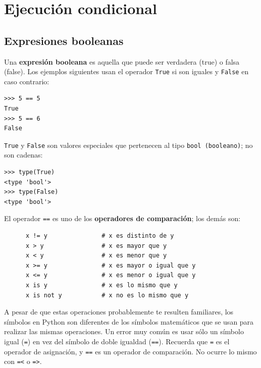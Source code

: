 
\chapter{Ejecución condicional}

\section{Expresiones booleanas}

Una {\bf expresión booleana} es aquella que puede ser verdadera (true)
o falsa (false). Los ejemplos siguientes usan el operador
{\tt True} si son iguales y {\tt False} en caso contrario:

\beforeverb
\begin{verbatim}
>>> 5 == 5
True
>>> 5 == 6
False
\end{verbatim}
\afterverb
%
{\tt True} y {\tt False} son valores especiales
que pertenecen al tipo {\tt bool (booleano)}; no son cadenas:


\beforeverb
\begin{verbatim}
>>> type(True)
<type 'bool'>
>>> type(False)
<type 'bool'>
\end{verbatim}
\afterverb
%
El operador {\tt ==} es uno de los {\bf operadores de comparación};
los demás son:

\beforeverb
\begin{verbatim}
      x != y               # x es distinto de y
      x > y                # x es mayor que y
      x < y                # x es menor que y
      x >= y               # x es mayor o igual que y
      x <= y               # x es menor o igual que y
      x is y               # x es lo mismo que y
      x is not y           # x no es lo mismo que y
\end{verbatim}
\afterverb
%
A pesar de que estas operaciones probablemente te resulten familiares, los
símbolos en Python son diferentes de los símbolos matemáticos que se usan
para realizar las mismas operaciones. Un error muy común
es usar sólo un símbolo igual ({\tt =}) en vez del símbolo de doble igualdad
({\tt ==}). Recuerda que {\tt =} es el operador de asignación, y
{\tt ==} es un operador de comparación. No ocurre lo mismo con
{\tt =<} o {\tt =>}.

